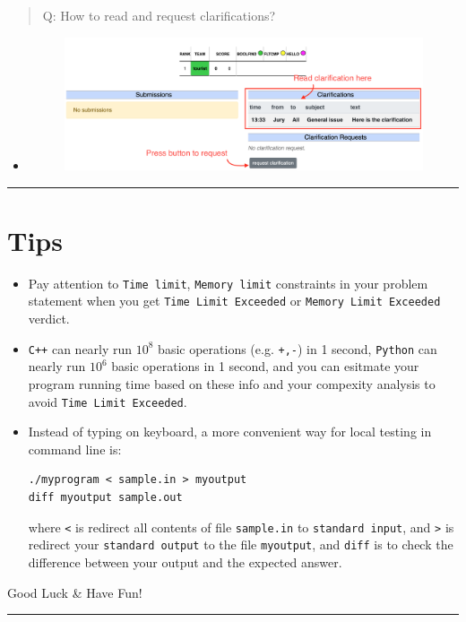 \documentclass[
]{article}
\begin{document}
\begin{quote}
  Q: How to read and request clarifications?
\end{quote}

\begin{itemize}
\item
  \begin{figure}
  \centering
  \includegraphics{clarification.png}
  \end{figure}
\end{itemize}

\begin{center}\rule{0.5\linewidth}{\linethickness}\end{center}

\hypertarget{header-n119}{%
\section{Tips}\label{header-n119}}

\begin{itemize}
\item
  Pay attention to \texttt{Time\ limit}, \texttt{Memory\ limit}
  constraints in your problem statement when you get
  \texttt{Time\ Limit\ Exceeded} or \texttt{Memory\ Limit\ Exceeded}
  verdict.
\item
  \texttt{C++} can nearly run \( 10^8\) basic operations (e.g.
  \texttt{+,-}) in 1 second, \texttt{Python} can nearly run \(10^6\)
  basic operations in 1 second, and you can esitmate your program
  running time based on these info and your compexity analysis to avoid
  \texttt{Time\ Limit\ Exceeded}.

\item Instead of typing on keyboard, a more convenient way for local testing in command line is:

\begin{verbatim}
./myprogram < sample.in > myoutput
diff myoutput sample.out
\end{verbatim}
    where \texttt{<} is redirect all contents of file \texttt{sample.in} to \texttt{standard input}, and \texttt{>} is redirect your \texttt{standard output} to the file \texttt{myoutput},
    and \texttt{diff} is to check the difference between your output and the expected answer.
\end{itemize}

\item
  \huge Good Luck \& Have Fun!

\begin{center}\rule{0.5\linewidth}{\linethickness}\end{center}
\end{document}
